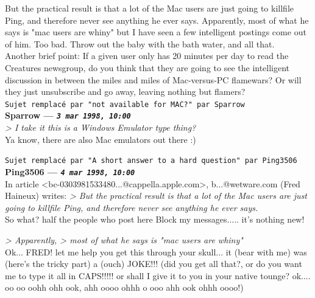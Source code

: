 \documentclass[11pt,twoside,a4paper]{article}
\begin{document}
\begin{multicols*}{2}
But the practical result is that a lot of the Mac users are just going to killfile Ping, and therefore never see anything he ever says. Apparently, most of what he says is "mac users are whiny" but I have seen a few intelligent postings come out of him. Too bad. Throw out the baby with the bath water, and all that.~\\

Another brief point: If a given user only has 20 minutes per day to read the Creatures newsgroup, do you think that they are going to see the intelligent discussion in between the miles and miles of Mac-versus-PC flamewars? Or will they just unsubscribe and go away, leaving nothing but flamers?~\\

 
		
	
		
\texttt{Sujet remplac{\'e} par "not available for MAC?" par Sparrow}~\\
		
	
		
\textbf{Sparrow --- \emph{\texttt{3 mar 1998, 10:00}}}~\\

\emph{> I take it this is a Windows Emulator type thing? }~\\

Ya know, there are also Mac emulators out there :)

 
		
	
		
\texttt{Sujet remplac{\'e} par "A short answer to a hard question" par Ping3506}~\\
		
	
		
\textbf{Ping3506 --- \emph{\texttt{4 mar 1998, 10:00}}}~\\

In article <bc-0303981533480...@cappella.apple.com>, b...@wetware.com (Fred Haineux) writes:
\emph{> But the practical result is that a lot of the Mac users are just going to killfile Ping, and therefore never see anything he ever says. }~\\

So what? half the people who post here Block my messages..... it's nothing new!

\emph{> Apparently, > most of what he says is "mac users are whiny" }~\\

Ok... FRED! let me help you get this through your skull... it (bear with me) was (here's the tricky part) a (ouch) JOKE!!! (did you get all that?, or do you want me to type it all in CAPS!!!!! or shall I give it to you in your native tounge? ok.... oo oo oohh ohh ook, ahh oooo ohhh o ooo ahh ook ohhh oooo!)


\end{multicols*}
\end{document}
